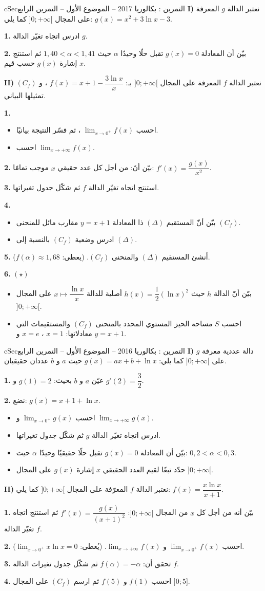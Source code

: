 \documentclass[12pt,a4paper]{article}
\newenvironment{BOX}[2]{\begin{otherlanguage}{english}\begin{arbox}{#1}{#2}}{\end{arbox}\end{otherlanguage}}
\newcounter{exo}
\newenvironment{tamrin}[1]{\stepcounter{exo}\begin{BOX}{cSec}{التمرين \theexo: #1}}{\end{BOX}}
\newenvironment{sq}{\begin{itemize}[leftmargin=2.4em,itemsep=3pt]}{\end{itemize}}
\newcommand{\qa}{\item[(أ)]}\newcommand{\qb}{\item[(ب)]}\newcommand{\qc}{\item[(جـ)]}\newcommand{\qd}{\item[(د)]}\newcommand{\qe}{\item[(هـ)]}
\newcommand{\QQ}[1]{\par\smallskip\textbf{#1.} }
\newcommand{\Lm}[1]{\displaystyle\lim_{x\to#1}}
\begin{document}
\begin{tamrin}{بكالوريا 2017 -- الموضوع الأول -- التمرين الرابع}
\textbf{I)} نعتبر الدالة $g$ المعرفة على المجال $]0;+\infty[$ كما يلي: $g(x)=x^2+3\ln x-3$.
\QQ{1} ادرس اتجاه تغيّر الدالة $g$.
\QQ{2} بيّن أن المعادلة $g(x)=0$ تقبل حلًا وحيدًا $\alpha$ حيث $1{,}40<\alpha<1{,}41$ ثم استنتج إشارة $g(x)$ حسب قيم $x$.\par
\textbf{II)} نعتبر الدالة $f$ المعرفة على المجال $]0;+\infty[$ بـ: $f(x)=x+1-\dfrac{3\ln x}x$ ، و $(C_f)$ تمثيلها البياني.
\QQ{1}
\begin{sq}
\qa احسب $\Lm{0^+}f(x)$ ، ثم فسّر النتيجة بيانيًا.
\qb احسب $\Lm{+\infty}f(x)$.
\end{sq}
\QQ{2} بيّن أنّ: من أجل كل عدد حقيقي $x$ موجب تمامًا: $f'(x)=\dfrac{g(x)}{x^2}$.
\QQ{3} استنتج اتجاه تغيّر الدالة $f$ ثم شكّل جدول تغيراتها.
\QQ{4}
\begin{sq}
\qa بيّن أنّ المستقيم $(\Delta)$ ذا المعادلة $y=x+1$ مقارب مائل للمنحنى $(C_f)$.
\qb ادرس وضعية $(C_f)$ بالنسبة إلى $(\Delta)$.
\end{sq}
\QQ{5} أنشئ المستقيم $(\Delta)$ والمنحنى $(C_f)$. (يعطى: $f(\alpha)\approx1{,}68$).
\QQ{6} $(\star)$
\begin{sq}
\qa بيّن أنّ الدالة $h$ حيث $h(x)=\dfrac12(\ln x)^2$ أصلية للدالة $x\mapsto\dfrac{\ln x}x$ على المجال $]0;+\infty[$.
\qb احسب $S$ مساحة الحيز المستوي المحدد بالمنحنى $(C_f)$ والمستقيمات التي معادلاتها: $x=1$ ، $x=e$ و $y=x+1$.
\end{sq}
\end{tamrin}

\begin{tamrin}{بكالوريا 2016 -- الموضوع الأول -- التمرين الرابع}
\textbf{I)} $g$ دالة عددية معرفة على $]0;+\infty[$ كما يلي: $g(x)=ax+b+\ln x$ حيث $a$ و $b$ عددان حقيقيان.
\QQ{1} عيّن $a$ و $b$ بحيث: $g(1)=2$ و $g'(2)=\dfrac32$.
\QQ{2} نضع: $g(x)=x+1+\ln x$.
\begin{sq}
\qa احسب $\Lm{0^+}g(x)$ و $\Lm{+\infty}g(x)$.
\qb ادرس اتجاه تغيّر الدالة $g$ ثم شكّل جدول تغيراتها.
\qc بيّن أن المعادلة $g(x)=0$ تقبل حلًا حقيقيًا وحيدًا $\alpha$ حيث: $0{,}2<\alpha<0{,}3$.
\qd حدّد تبعًا لقيم العدد الحقيقي $x$ إشارة $g(x)$ على المجال $]0;+\infty[$.
\end{sq}
\textbf{II)} نعتبر الدالة $f$ المعرّفة على المجال $]0;+\infty[$ كما يلي: $f(x)=\dfrac{x\ln x}{x+1}$.
\QQ{1} بيّن أنه من أجل كل $x$ من المجال $]0;+\infty[$: $f'(x)=\dfrac{g(x)}{(x+1)^2}$ ثم استنتج اتجاه تغيّر الدالة $f$.
\QQ{2} احسب $\Lm{0^+}f(x)$ و $\Lm{+\infty}f(x)$. (يُعطى: $\Lm{0^+}x\ln x=0$).
\QQ{3} تحقق أن: $f(\alpha)=-\alpha$ ثم شكّل جدول تغيرات الدالة $f$.
\QQ{4} احسب $f(1)$ و $f(5)$ ثم ارسم $(C_f)$ على المجال $]0;5]$.
\end{tamrin}
\end{document}
